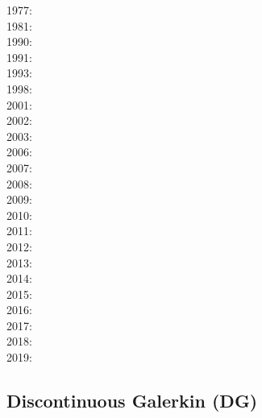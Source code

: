 \noindent
{\scriptsize
1977: \cite{rola77}\\
1981: \cite{dzan81}\\
1990: \cite{lips90}\\
1991: \cite{spak91}\\
1993: \cite{kara93}\\
1998: \cite{bisp98}\\
2001: \cite{buda01}\\
2002: \cite{bebo02}\\
2003: \cite{krhh03}\cite{sosi03}\cite{pimo03}\cite{sosi03}\\
2006: \cite{masr06}\cite{arte06}\\
2007: \cite{mitk07}\cite{lobc07}\cite{rimb07}\\
2008: \cite{zhou08}\cite{zhou08}\cite{roma08}\cite{tekc08}\\
2009: \cite{scbr09}\\
2010: \cite{dada10}\cite{sifb10}\cite{katc10}\\
2011: \cite{ridv11}\\
2012: \cite{hawj12}\cite{resa12}\cite{hawj12}\cite{fesw12}\cite{simj12}\cite{beck12}\cite{pahk12}\\
2013: \cite{ress13}\cite{ebbf13}\cite{davi13}\cite{scle13}\cite{waja13}\\
2014: \cite{paml14}\cite{ebbf14}\cite{krbk14}\cite{licl14}\cite{aubb14}\\
2015: \cite{boem15}\cite{brrs15}\cite{furc15}\\
2016: \cite{kord16}\cite{moek16}\cite{rond16}\cite{duti16}\cite{cogb16}\\
2017: \cite{roev17}\\
2018: \cite{pabn18}\cite{hamp18}\cite{ghmc18}\cite{homs18}\\
2019: \cite{sopg19}\cite{shar19}
}

\subsection{Discontinuous Galerkin (DG)}


